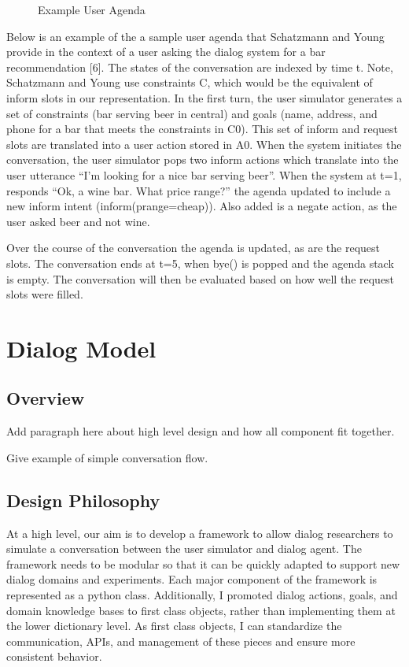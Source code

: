 \begin{figure}[h!]
	\caption{Example User Agenda }
	\label{fig:goals1}
\end{figure}


Below is an  example of the a sample user agenda that Schatzmann and Young provide in the context of a user asking the dialog system for a bar recommendation [6]. The states of the conversation are indexed by time t. Note, Schatzmann and Young use constraints C, which would be the equivalent of inform slots in our representation. In the first turn, the user simulator generates a set of constraints (bar serving beer in central) and goals (name, address, and phone for a bar that meets the constraints in C0). This set of inform and request slots are translated into a user action stored in A0. When the system initiates the conversation, the user simulator pops two inform actions which translate into the user utterance “I’m looking for a nice bar serving beer”. When the system at t=1, responds “Ok, a wine bar. What price range?” the agenda updated to include a new inform intent (inform(prange=cheap)). Also added is a negate action, as the user asked beer and not wine. 

Over the course of the conversation the agenda is updated, as are the request slots. The conversation ends at t=5, when bye() is popped and the agenda stack is empty. The conversation will then be evaluated based on how well the request slots were filled.



\section{Dialog Model}

\subsection{Overview}

Add paragraph here about high level design and how all component fit together. 

Give example of simple conversation flow.


\subsection{Design Philosophy}

At a high level, our aim is to develop a framework to allow dialog researchers to simulate a conversation between the user simulator and dialog agent. The framework needs to be modular so that it can be quickly adapted to support new dialog domains and experiments. Each major component of the framework is represented as a python class. Additionally, I promoted dialog actions, goals, and domain knowledge bases to first class objects, rather than implementing them at the lower dictionary level. As first class objects, I can standardize the communication, APIs, and management of these pieces and ensure more consistent behavior.

